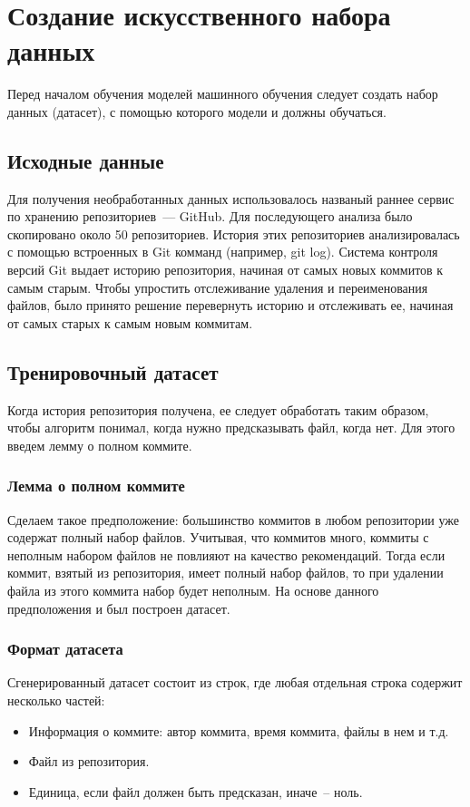 \section{Создание искусственного набора данных}
Перед началом обучения моделей машинного обучения следует создать набор данных (датасет), с помощью которого модели и должны обучаться.
    \subsection{Исходные данные}
Для получения необработанных данных использовалось названый раннее сервис по хранению репозиториев~--- GitHub. Для последующего анализа было скопировано около 50 репозиториев. История этих репозиториев анализировалась с помощью встроенных в Git комманд (например, git log). Система контроля версий Git выдает историю репозитория, начиная от самых новых коммитов к самым старым. Чтобы упростить отслеживание удаления и переименования файлов, было принято решение перевернуть историю и отслеживать ее, начиная от самых старых к самым новым коммитам.
    \subsection{Тренировочный датасет}
Когда история репозитория получена, ее следует обработать таким образом, чтобы алгоритм понимал, когда нужно предсказывать файл, когда нет. Для этого введем лемму о полном коммите.
    \subsubsection{Лемма о полном коммите}
Сделаем такое предположение: большинство коммитов в любом репозитории уже содержат полный набор файлов. Учитывая, что коммитов много, коммиты с неполным набором файлов не повлияют на качество рекомендаций. Тогда если коммит, взятый из репозитория, имеет полный набор файлов, то при удалении файла из этого коммита набор будет неполным. На основе данного предположения и был построен датасет.
    \subsubsection{Формат датасета}
Сгенерированный датасет состоит из строк, где любая отдельная строка содержит несколько частей:
    \begin{itemize}
		\item Информация о коммите: автор коммита, время коммита, файлы в нем и т.д.
		\item Файл из репозитория.
		\item Единица, если файл должен быть предсказан, иначе~-- ноль.
	\end{itemize}
